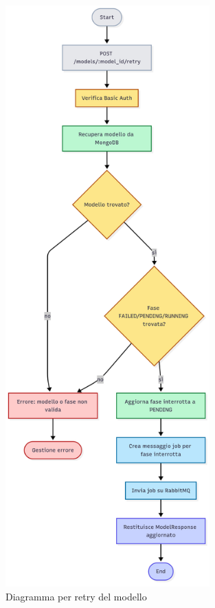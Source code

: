 \begin{figure}[p]
	\centering
	\includegraphics[width=0.7\textwidth]{images/retry_model_diagram.jpg}
	\caption{Diagramma per retry del modello}
	\label{fig:retry_diagram}
\end{figure}

